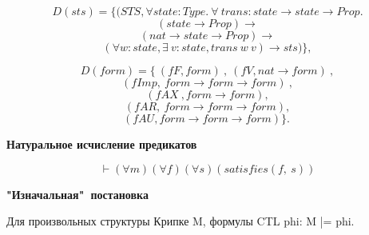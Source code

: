 \documentclass[12pt]{article}
\begin{document}
$$
D(sts)= \{ (STS, \forall state : Type.\ \forall\ trans : state \xrightarrow{}  state \xrightarrow{}  Prop.
$$
$$
       (state \xrightarrow{}  Prop) \xrightarrow{} 
$$
$$      
       (nat \xrightarrow{}  state \xrightarrow{}  Prop) \xrightarrow{} 
$$
$$      
       (\forall w : state, \exists\ v : state, trans\ w\ v) \xrightarrow{}  sts)\},
$$



$$
D(form)= \{ 
\ (fF , form)\ ,\ (fV, nat \xrightarrow{}  form)\ ,
$$
$$
  (fImp,\ form \xrightarrow{}  form \xrightarrow{}  form)\ , 
$$
$$
  (fAX\ , form \xrightarrow{}  form),
$$ 
$$
  (fAR,\ form \xrightarrow{}  form \xrightarrow{}  form),
$$  
$$
  (fAU , form \xrightarrow{}  form \xrightarrow{}  form) \}. \ 
$$


\textbf{Натуральное исчисление предикатов}

$$ \vdash (\forall m)(\forall f)(\forall s)(satisfies(f,\ s))$$

\textbf{"Изначальная"\ постановка}

Для произвольных структуры Крипке M, формулы CTL phi: M |= phi.








\end{document}
